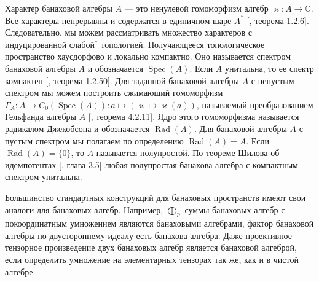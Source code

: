 Характер банаховой алгебры $A$ --- это ненулевой гомоморфизм алгебр
$\varkappa:A\to\mathbb{C}$. Все характеры непрерывны и содержатся в единичном
шаре $A^*$ [\cite{HelBanLocConvAlg}, теорема 1.2.6]. Следовательно, мы можем
рассматривать множество характеров с индуцированной слабой$^*$ топологией.
Получающееся топологическое пространство хаусдорфово и локально компактно. Оно
называется спектром банаховой алгебры $A$ и обозначается
$\operatorname{Spec}(A)$. Если $A$ унитальна, то ее спектр компактен
[\cite{HelBanLocConvAlg}, теорема 1.2.50]. Для заданной банаховой алгебры $A$ с
непустым спектром мы можем построить сжимающий гомоморфизм $\Gamma_A:A\to
C_0(\operatorname{Spec}(A)):a\mapsto(\varkappa\mapsto \varkappa(a))$, называемый
преобразованием Гельфанда алгебры $A$ [\cite{HelBanLocConvAlg}, теорема 4.2.11].
Ядро этого гомоморфизма называется радикалом Джекобсона и обозначается
$\operatorname{Rad}(A)$. Для банаховой алгебры $A$ с пустым спектром мы полагаем
по определению $\operatorname{Rad}(A)=A$. Если $\operatorname{Rad}(A)=\{0\}$, то
$A$ называется полупростой. По теореме Шилова об идемпотентах
[\cite{KaniBanAlg}, глава 3.5] любая полупростая банахова алгебра с компактным
спектром унитальна.

Большинство стандартных конструкций для банаховых пространств имеют свои аналоги
для банаховых алгебр. Например, $\bigoplus_p$-суммы банаховых алгебр с
покоординатным умножением являются банаховыми алгебрами, фактор банаховой
алгебры по двустороннему идеалу есть банахова алгебра. Даже проективное
тензорное произведение двух банаховых алгебр является банаховой алгеброй, если
определить умножение на элементарных тензорах так же, как и в чистой алгебре.

